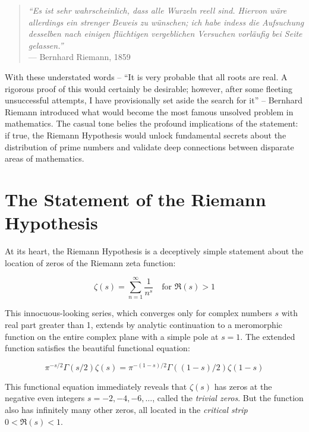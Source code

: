 
\begin{quote}
\textit{``Es ist sehr wahrscheinlich, dass alle Wurzeln reell sind. Hiervon wäre allerdings ein strenger Beweis zu wünschen; ich habe indess die Aufsuchung desselben nach einigen flüchtigen vergeblichen Versuchen vorläufig bei Seite gelassen.''} \\
--- Bernhard Riemann, 1859
\end{quote}

\noindent With these understated words -- ``It is very probable that all roots are real. A rigorous proof of this would certainly be desirable; however, after some fleeting unsuccessful attempts, I have provisionally set aside the search for it'' -- Bernhard Riemann introduced what would become the most famous unsolved problem in mathematics. The casual tone belies the profound implications of the statement: if true, the Riemann Hypothesis would unlock fundamental secrets about the distribution of prime numbers and validate deep connections between disparate areas of mathematics.

\section*{The Statement of the Riemann Hypothesis}

At its heart, the Riemann Hypothesis is a deceptively simple statement about the location of zeros of the Riemann zeta function:

\begin{equation}
\zeta(s) = \sum_{n=1}^{\infty} \frac{1}{n^s} \quad \text{for } \Re(s) > 1
\end{equation}

This innocuous-looking series, which converges only for complex numbers $s$ with real part greater than 1, extends by analytic continuation to a meromorphic function on the entire complex plane with a simple pole at $s = 1$. The extended function satisfies the beautiful functional equation:

\begin{equation}
\pi^{-s/2} \Gamma(s/2) \zeta(s) = \pi^{-(1-s)/2} \Gamma((1-s)/2) \zeta(1-s)
\end{equation}

This functional equation immediately reveals that $\zeta(s)$ has zeros at the negative even integers $s = -2, -4, -6, \ldots$, called the \emph{trivial zeros}. But the function also has infinitely many other zeros, all located in the \emph{critical strip} $0 < \Re(s) < 1$.

